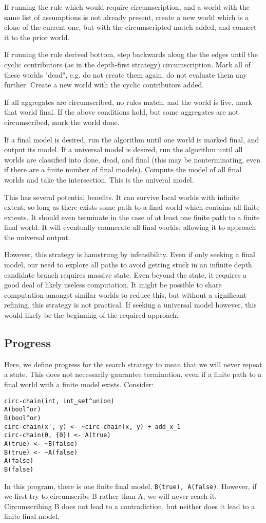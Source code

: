 If running the rule which would require circumscription, and a world with the same list of assumptions is not already present, create a new world which is a clone of the current one, but with the circumscripted match added, and connect it to the prior world.

If running the rule derived bottom, step backwards along the the edges until the cyclic contributors (as in the depth-first strategy) circumscription.
Mark all of these worlds "dead", e.g. do not create them again, do not evaluate them any further.
Create a new world with the cyclic contributors added.

If all aggregates are circumscribed, no rules match, and the world is live, mark that world final.
If the above conditions hold, but some aggregates are not circumscribed, mark the world done.

If a final model is desired, run the algorithm until one world is marked final, and output its model.
If a universal model is desired, run the algorithm until all worlds are classified into done, dead, and final (this may be nonterminating, even if there are a finite number of final models).
Compute the model of all final worlds and take the intersection.
This is the univeral model. 

This has several potential benefits.
It can survive local worlds with infinite extent, so long as there exists some path to a final world which contains all finite extents.
It should even terminate in the case of at least one finite path to a finite final world.
It will eventually enumerate all final worlds, allowing it to approach the universal output.

However, this strategy is hamstrung by infeasibility.
Even if only seeking a final model, our need to explore all paths to avoid getting stuck in an infinite depth candidate branch requires massive state.
Even beyond the state, it requires a good deal of likely useless computation.
It might be possible to share computation amongst similar worlds to reduce this, but without a significant refining, this strategy is not practical.
If seeking a universal model however, this would likely be the beginning of the required approach. 

\subsection{Progress}
\label{sec:progress}
Here, we define progress for the search strategy to mean that we will never repeat a state.
This does not necessarily gaurantee termination, even if a finite path to a final world with a finite model exists.
Consider:
\begin{verbatim}
circ-chain(int, int_set^union)
A(bool^or)
B(bool^or)
circ-chain(x', y) <- ~circ-chain(x, y) + add_x_1
circ-chain(0, {0}) <- A(true)
A(true) <- ~B(false)
B(true) <- ~A(false)
A(false)
B(false)
\end{verbatim}
In this program, there is one finite final model, \texttt{B(true), A(false)}.
However, if we first try to circumscribe B rather than A, we will never reach it.
Circumscribing B does not lead to a contradiction, but neither does it lead to a finite final model.

